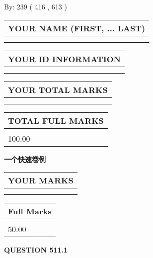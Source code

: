 \documentclass{ctexart}
\begin{document}
   
\hspace{1.0in} By: 
 239 ( 416 ,  613 )
   
   
   
   
\newpage 
\setcounter{page}{ 
   511001 } 
   
   
   
   
\noindent\begin{tabular}{|l|}
\hline
YOUR NAME (FIRST, ... LAST)  \\
\hline
 \\ 
 \\ 
\hline
\end{tabular}
\hspace{0.05in} \begin{tabular}{|l|}
\hline
 YOUR   ID   INFORMATION  \\
\hline
 \\ 
 \\ 
\hline
\end{tabular}
   
   
\vspace{0.2in}\noindent\begin{tabular}{|l|}
\hline
YOUR TOTAL MARKS  \\
\hline
 \\ 
 \\ 
\hline
\end{tabular}
\hspace{0.05in} \begin{tabular}{|l|}
\hline
TOTAL FULL MARKS  \\
\hline
 \\ 
100.00 \\
\hline
\end{tabular}
   
   
 \vspace{0.2in}
{\LARGE {\textbf{ 一个快速卷例}}}
   
   
  
\vspace{0.2in}
  
\noindent\begin{tabular}{|l|}
\hline
 YOUR MARKS  \\
\hline
 \\ 
 \\ 
\hline
\end{tabular}
\hspace{0.05in} \begin{tabular}{|l|}
\hline
 Full Marks  \\
\hline
 \\ 
50.00 \\
\hline
\end{tabular}
{\textbf{\Large{QUESTION
511.1 
}}}
  
\end{document}
